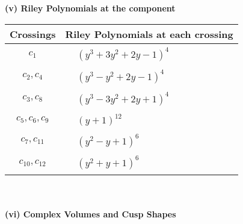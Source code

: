 \documentclass[1p]{elsarticle_modified}
\theoremstyle{definition}
\begin{document}
\newpage\renewcommand{\arraystretch}{1}
\flushleft \textbf{(v) Riley Polynomials at the component}\newline \\
\begin{tabular}{m{50pt}|m{274pt}}
Crossings & \hspace{64pt}Riley Polynomials at each crossing \\
\hline $$\begin{aligned}c_{1}\end{aligned}$$&$\begin{aligned}
&(y^3+3 y^2+2 y-1)^4
\end{aligned}$\\
\hline $$\begin{aligned}c_{2},c_{4}\end{aligned}$$&$\begin{aligned}
&(y^3- y^2+2 y-1)^4
\end{aligned}$\\
\hline $$\begin{aligned}c_{3},c_{8}\end{aligned}$$&$\begin{aligned}
&(y^3-3 y^2+2 y+1)^4
\end{aligned}$\\
\hline $$\begin{aligned}c_{5},c_{6},c_{9}\end{aligned}$$&$\begin{aligned}
&(y+1)^{12}
\end{aligned}$\\
\hline $$\begin{aligned}c_{7},c_{11}\end{aligned}$$&$\begin{aligned}
&(y^2- y+1)^6
\end{aligned}$\\
\hline $$\begin{aligned}c_{10},c_{12}\end{aligned}$$&$\begin{aligned}
&(y^2+y+1)^6
\end{aligned}$\\
\hline
\end{tabular}\\~\\
\newpage\flushleft \textbf{(vi) Complex Volumes and Cusp Shapes}
\end{document}

